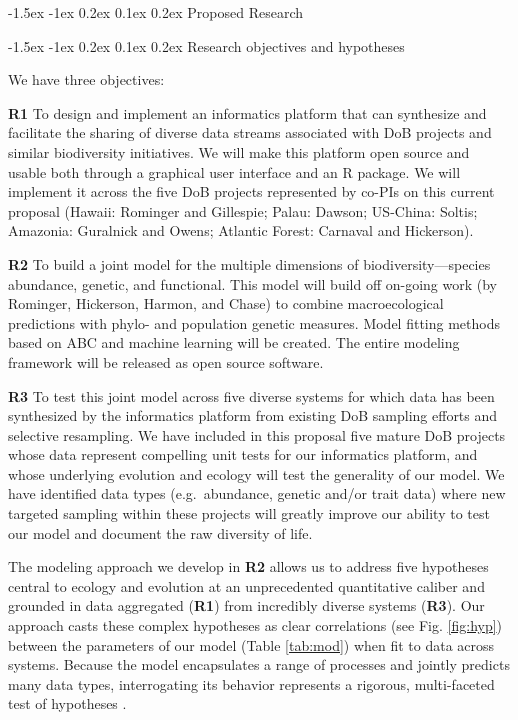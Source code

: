 \documentclass[11pt]{article}
\makeatletter
\renewcommand\section{\@startsection{section}{1}{\z@}%
                                  {-1.5ex \@plus -1ex \@minus 0.2ex}%
                                  {0.1ex \@plus 0.2ex}%
                                  {\normalfont\Large\bfseries}}
\renewcommand\subsection{\@startsection{subsection}{1}{\z@}%
                                  {-1.5ex \@plus -1ex \@minus 0.2ex}%
                                  {0.1ex \@plus 0.2ex}%
                                  {\normalfont\large\bfseries}}
\makeatother
\begin{document}
\section{Proposed Research}\label{proposed-research}

\subsection{Research objectives and
hypotheses}\label{research-objectives-and-hypotheses}

We have three objectives:

\textbf{R1} To design and implement an informatics platform that can
synthesize and facilitate the sharing of diverse data streams associated
with DoB projects and similar biodiversity initiatives. We will make
this platform open source and usable both through a graphical user
interface and an R \cite{R_Development_Core2013-ze} package. We will
implement it across the five DoB projects represented by co-PIs on this
current proposal (Hawaii: Rominger and Gillespie; Palau: Dawson;
US-China: Soltis; Amazonia: Guralnick and Owens; Atlantic Forest:
Carnaval and Hickerson).

\textbf{R2} To build a joint model for the multiple dimensions of
biodiversity---species abundance, genetic, and functional. This model
will build off on-going work (by Rominger, Hickerson, Harmon, and Chase)
to combine macroecological predictions with phylo- and population
genetic measures. Model fitting methods based on ABC and machine
learning will be created. The entire modeling framework will be released
as open source software.

\textbf{R3} To test this joint model across five diverse systems for
which data has been synthesized by the informatics platform from
existing DoB sampling efforts and selective resampling. We have included
in this proposal five mature DoB projects whose data represent
compelling unit tests for our informatics platform, and whose underlying
evolution and ecology will test the generality of our model. We have
identified data types (e.g.~abundance, genetic and/or trait data) where
new targeted sampling within these projects will greatly improve our
ability to test our model and document the raw diversity of life.

The modeling approach we develop in \textbf{R2} allows us to address
five hypotheses central to ecology and evolution at an unprecedented
quantitative caliber and grounded in data aggregated (\textbf{R1}) from
incredibly diverse systems (\textbf{R3}). Our approach casts these
complex hypotheses as clear correlations (see Fig. \ref{fig:hyp})
between the parameters of our model (Table \ref{tab:mod}) when fit to
data across systems. Because the model encapsulates a range of processes
and jointly predicts many data types, interrogating its behavior
represents a rigorous, multi-faceted test of hypotheses
\cite{McGill2003-sf,McGill2007-zd,Leibold2017-jv}.
\end{document}
